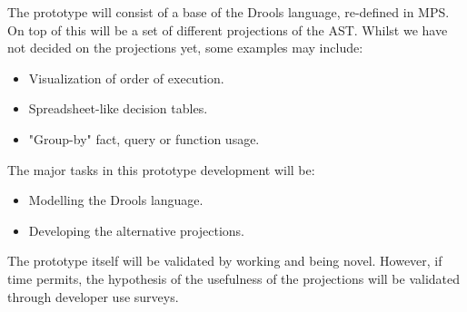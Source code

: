 The prototype will consist of a base of the Drools language, re-defined in MPS.  
On top of this will be a set of different projections of the AST.
Whilst we have not decided on the projections yet, some examples may include:
\begin{itemize}
    \item Visualization of order of execution.
    \item Spreadsheet-like decision tables.
    \item "Group-by" fact, query or function usage.
\end{itemize}


The major tasks in this prototype development will be: 
\begin{itemize}
    \item Modelling the Drools language.
    \item Developing the alternative projections.
\end{itemize}

The prototype itself will be validated by working and being novel.
However, if time permits, the hypothesis of the usefulness of the projections will be validated through developer use surveys.

